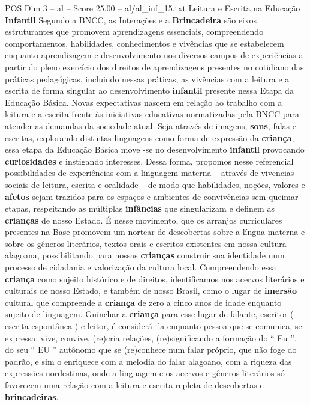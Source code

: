 \begin{textsample}{POS Dim 3 – al – Score 25.00 – al/al\_inf\_15.txt}  \label{ex:f3_pos_212}
Leitura e Escrita na Educação \textbf{Infantil} Segundo a BNCC, as Interações e a \textbf{Brincadeira} são eixos estruturantes que promovem aprendizagens essenciais, compreendendo comportamentos, habilidades, conhecimentos e vivências que se estabelecem enquanto aprendizagem e desenvolvimento nos diversos campos de experiências a partir do pleno exercício dos direitos de aprendizagens presentes no cotidiano das práticas pedagógicas, incluindo nessas práticas, as vivências com a leitura e a escrita de forma singular ao desenvolvimento \textbf{infantil} presente nessa Etapa da Educação Básica.
Novas expectativas nascem em relação ao trabalho com a leitura e a escrita frente às iniciativas educativas normatizadas pela BNCC para atender as demandas da sociedade atual.
Seja através de imagens, \textbf{sons}, falas e escritas, explorando distintas linguagens como forma de expressão da \textbf{criança}, essa etapa da Educação Básica move -se no desenvolvimento \textbf{infantil} provocando \textbf{curiosidades} e instigando interesses.
Dessa forma, propomos nesse referencial possibilidades de experiências com a linguagem materna – através de vivencias sociais de leitura, escrita e oralidade – de modo que habilidades, noções, valores e \textbf{afetos} sejam trazidos para os espaços e ambientes de convivências sem queimar etapas, respeitando as múltiplas \textbf{infâncias} que singularizam e definem as \textbf{crianças} de nosso Estado.
É nesse movimento, que os arranjos curriculares presentes na Base promovem um nortear de descobertas sobre a língua materna e sobre os gêneros literários, textos orais e escritos existentes em nossa cultura alagoana, possibilitando para nossas \textbf{crianças} construir sua identidade num processo de cidadania e valorização da cultura local.
Compreendendo essa \textbf{criança} como sujeito histórico e de direitos, identificamos nos acervos literários e culturais de nosso Estado, e também de nosso Brasil, como o lugar de \textbf{imersão} cultural que compreende a \textbf{criança} de zero a cinco anos de idade enquanto sujeito de linguagem.
Guinchar a \textbf{criança} para esse lugar de falante, escritor ( escrita espontânea ) e leitor, é considerá -la enquanto pessoa que se comunica, se expressa, vive, convive, (re)cria relações, (re)significando a formação do “ Eu ”, do seu “ EU ” autônomo que se (re)conhece num falar próprio, que não foge do padrão, e sim o enriquece com a melodia do falar alagoano, com a riqueza das expressões nordestinas, onde a linguagem e os acervos e gêneros literários só favorecem uma relação com a leitura e escrita repleta de descobertas e \textbf{brincadeiras}.

\end{textsample}
